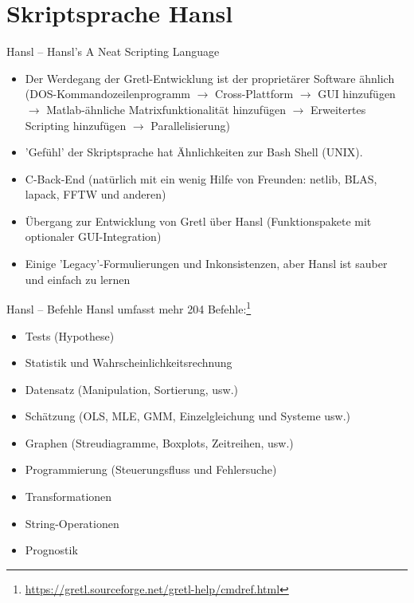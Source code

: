 \documentclass{beamer}[11pt]
\begin{document}
\section{Skriptsprache Hansl}


\begin{frame}{Hansl -- Hansl's A Neat Scripting Language}
	\begin{itemize}
		\item Der Werdegang der Gretl-Entwicklung ist der proprietärer Software ähnlich (DOS-Kommandozeilenprogramm $\to$ Cross-Plattform $\to$ GUI hinzufügen $\to$ Matlab-ähnliche Matrixfunktionalität hinzufügen $\to$ Erweitertes Scripting hinzufügen $ \to $ Parallelisierung) %
		\item 'Gefühl' der Skriptsprache hat Ähnlichkeiten zur Bash Shell (UNIX).
		\item C-Back-End (natürlich mit ein wenig Hilfe von Freunden: netlib, BLAS, lapack, FFTW und anderen)
		\item Übergang zur Entwicklung von Gretl über Hansl (Funktionspakete mit optionaler GUI-Integration)
		\item Einige 'Legacy'-Formulierungen und Inkonsistenzen, aber Hansl ist sauber und einfach zu lernen
	\end{itemize}
\end{frame}


\begin{frame}{Hansl -- Befehle}
	Hansl umfasst mehr 204 Befehle:\footnote{\url{https://gretl.sourceforge.net/gretl-help/cmdref.html}}
	\begin{itemize}
		\item Tests (Hypothese)
		\item Statistik und Wahrscheinlichkeitsrechnung
		\item Datensatz (Manipulation, Sortierung, usw.)
		\item Schätzung (OLS, MLE, GMM, Einzelgleichung und Systeme usw.)
		\item Graphen (Streudiagramme, Boxplots, Zeitreihen, usw.)
		\item Programmierung (Steuerungsfluss und Fehlersuche)
		\item Transformationen
		\item String-Operationen
		\item Prognostik
	\end{itemize}
\end{frame}
\end{document}

